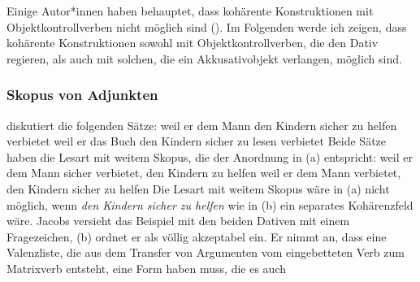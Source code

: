 Einige Autor*innen haben behauptet, dass kohärente Konstruktionen mit Objektkontrollverben
nicht möglich sind (\citealp[]{Sternefeld85b}).
Im Folgenden werde ich zeigen, dass kohärente Konstruktionen sowohl mit Objektkontrollverben,
die den Dativ regieren, als auch mit solchen, die ein Akkusativobjekt verlangen, möglich
sind.

\subsubsection{Skopus von Adjunkten}
\label{sec-obj-contr-scope}

\citet[]{Jacobs91a} diskutiert die folgenden Sätze:
\eal
\ex{}
weil    er       dem Mann      den Kindern        sicher zu helfen verbietet
\ex
weil    er       das Buch      den Kindern        sicher zu lesen verbietet
\zl
Beide Sätze haben die Lesart mit weitem Skopus, die der Anordnung in (a) entspricht:
\eal
\ex weil er dem Mann sicher verbietet, den Kindern zu helfen
\ex weil er dem Mann verbietet, den Kindern sicher zu helfen
\zl
Die Lesart mit weitem Skopus wäre in (a) nicht möglich, wenn \emph{den Kindern sicher zu
  helfen} wie in (b) ein separates Kohärenzfeld wäre. Jacobs versieht das Beispiel mit den beiden Dativen
mit einem Fragezeichen, (b) ordnet er als völlig akzeptabel ein.
Er nimmt an, dass eine Valenzliste, die aus dem Transfer von Argumenten vom
eingebetteten Verb zum Matrixverb entsteht, eine Form haben muss, die es auch
